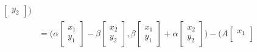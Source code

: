 \documentclass[../functional_analysis.tex]{subfiles}
\begin{document}
\begin{align*}
\begin{bmatrix}
			                                                                                                                                                                         y_2
		                                                                                                                                                                         \end{bmatrix}\biggr)                     \\
	                                                         & = \biggl( \alpha \begin{bmatrix}
			                                                                            x_1 \\
			                                                                            y_1
		                                                                            \end{bmatrix} - \beta \begin{bmatrix}
			                                                                                                  x_2 \\
			                                                                                                  y_2
		                                                                                                  \end{bmatrix}, \beta \begin{bmatrix}
			                                                                                                                       x_1 \\
			                                                                                                                       y_1
		                                                                                                                       \end{bmatrix} + \alpha \begin{bmatrix}
			                                                                                                                                              x_2 \\ y_2
		                                                                                                                                              \end{bmatrix}\biggr) - \biggl(A\begin{bmatrix}
			                                                                                                                                                                             x_1 \\

\end{bmatrix}
\end{align*}
\end{document}
